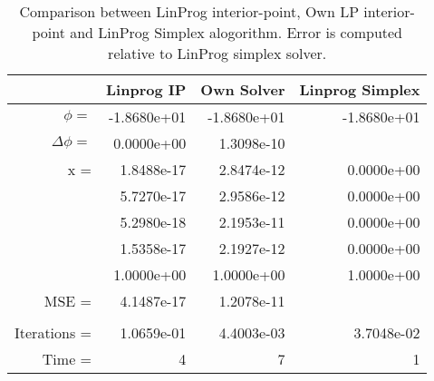 \begin{table}[ht]
\centering
\begin{tabular}{rrrr}
\toprule
 & Linprog IP & Own Solver & Linprog Simplex \\
\midrule
$\phi =$ & -1.8680e+01 & -1.8680e+01 & -1.8680e+01 \\
$\Delta \phi =$ & 0.0000e+00 & 1.3098e-10 &  \\
x = & 1.8488e-17 & 2.8474e-12 & 0.0000e+00 \\
 & 5.7270e-17 & 2.9586e-12 & 0.0000e+00 \\
 & 5.2980e-18 & 2.1953e-11 & 0.0000e+00 \\
 & 1.5358e-17 & 2.1927e-12 & 0.0000e+00 \\
 & 1.0000e+00 & 1.0000e+00 & 1.0000e+00 \\
MSE = & 4.1487e-17 & 1.2078e-11 &  \\
 &  &  &  \\
Iterations = & 1.0659e-01 & 4.4003e-03 & 3.7048e-02 \\
Time = & 4 & 7 & 1 \\
\bottomrule
\end{tabular}
\caption{Comparison between LinProg interior-point, Own LP interior-point and LinProg Simplex alogorithm. Error is computed relative to LinProg simplex solver.}
\label{table:ex3_objective_comp_simplex}
\end{table}
